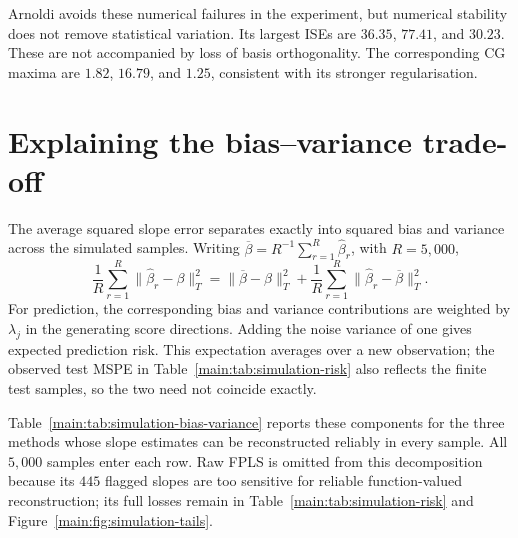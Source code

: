 Arnoldi avoids these numerical failures in the experiment, but numerical
stability does not remove statistical variation. Its largest ISEs are
$36.35$, $77.41$, and $30.23$. These are not accompanied by loss of
basis orthogonality. The corresponding CG maxima are $1.82$, $16.79$,
and $1.25$, consistent with its stronger regularisation.

\section{Explaining the bias--variance trade-off}
\label{main:sec:simulation-bias-variance}

The average squared slope error separates exactly into squared bias and
variance across the simulated samples. Writing
$\overline\beta=R^{-1}\sum_{r=1}^{R}\widehat\beta_r$, with $R=5{,}000$,
\begin{equation}
    \frac1R\sum_{r=1}^{R}\|\widehat\beta_r-\beta\|_T^2
    =\|\overline\beta-\beta\|_T^2+
    \frac1R\sum_{r=1}^{R}\|\widehat\beta_r-\overline\beta\|_T^2.
    \label{main:eq:simulation-decomposition}
\end{equation}
For prediction, the corresponding bias and variance contributions are
weighted by $\lambda_j$ in the generating score directions. Adding the
noise variance of one gives expected prediction risk. This expectation
averages over a new observation; the observed test MSPE in
Table~\ref{main:tab:simulation-risk} also reflects the finite test samples,
so the two need not coincide exactly.

Table~\ref{main:tab:simulation-bias-variance} reports these components for
the three methods whose slope estimates can be reconstructed reliably
in every sample. All $5{,}000$ samples enter each row. Raw FPLS is omitted
from this decomposition because its $445$ flagged slopes are too sensitive
for reliable function-valued reconstruction; its full losses remain in
Table~\ref{main:tab:simulation-risk} and
Figure~\ref{main:fig:simulation-tails}.

